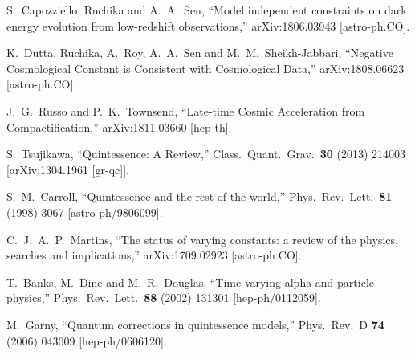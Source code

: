 \documentclass[11pt,a4paper]{article}
\begin{document}
\begin{thebibliography}{99}
  S.~Capozziello, Ruchika and A.~A.~Sen,
  ``Model independent constraints on dark energy evolution from low-redshift observations,''
  arXiv:1806.03943 [astro-ph.CO].

  K.~Dutta, Ruchika, A.~Roy, A.~A.~Sen and M.~M.~Sheikh-Jabbari,
  ``Negative Cosmological Constant is Consistent with Cosmological Data,''
  arXiv:1808.06623 [astro-ph.CO].
 
  J.~G.~Russo and P.~K.~Townsend,
  ``Late-time Cosmic Acceleration from Compactification,''
  arXiv:1811.03660 [hep-th].  
  
  S.~Tsujikawa,
  ``Quintessence: A Review,''
  Class.\ Quant.\ Grav.\  {\bf 30} (2013) 214003
  [arXiv:1304.1961 [gr-qc]].
  

  S.~M.~Carroll,
  ``Quintessence and the rest of the world,''
  Phys.\ Rev.\ Lett.\  {\bf 81} (1998) 3067
  [astro-ph/9806099].

  C.~J.~A.~P.~Martins,
  ``The status of varying constants: a review of the physics, searches and implications,''
  arXiv:1709.02923 [astro-ph.CO].
  

  T.~Banks, M.~Dine and M.~R.~Douglas,
  ``Time varying alpha and particle physics,''
  Phys.\ Rev.\ Lett.\  {\bf 88} (2002) 131301
  [hep-ph/0112059].


  M.~Garny,
  ``Quantum corrections in quintessence models,''
  Phys.\ Rev.\ D {\bf 74} (2006) 043009
  [hep-ph/0606120].



\end{thebibliography}
\end{document}
